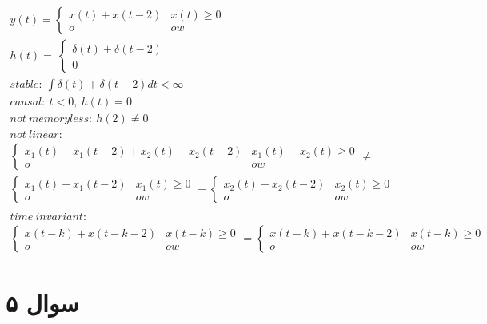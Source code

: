 \documentclass{article}[12pt]
\begin{document}
\begin{equation}
	\begin{gathered}
			y( t) =\begin{cases}
				x( t) +x( t-2) & x( t) \geqslant 0\\
				o & ow
			\end{cases}\\
			h( t) =\ \begin{cases}
				\delta ( t) +\delta ( t-2) & \\
				0 & 
			\end{cases}\\
			stable:\ \int \delta ( t) +\delta ( t-2) dt< \infty \\
			causal:\ t< 0,\ h( t) =0\\
			not\ memoryless:\ h( 2) \neq 0\\
			not\ linear:\\
			\begin{cases}
				x_{1}( t) +x_{1}( t-2) +x_{2}( t) +x_{2}( t-2) & x_{1}( t) +x_{2}( t) \geqslant 0\\
				o & ow
			\end{cases} \neq \\
			\begin{cases}
				x_{1}( t) +x_{1}( t-2) & x_{1}( t) \geqslant 0\\
				o & ow
			\end{cases} +\begin{cases}
				x_{2}( t) +x_{2}( t-2) & x_{2}( t) \geqslant 0\\
				o & ow
			\end{cases}\\
			\\
			time\ invariant:\\
			\begin{cases}
				x( t-k) +x( t-k-2) & x( t-k) \geqslant 0\\
				o & ow
			\end{cases} =\begin{cases}
				x( t-k) +x( t-k-2) & x( t-k) \geqslant 0\\
				o & ow
			\end{cases}
	\end{gathered}
\end{equation}

\section{سوال ۵}
\end{document}
